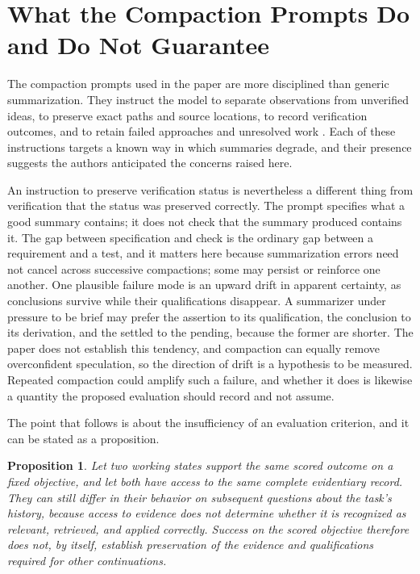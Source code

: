\documentclass[11pt]{article}
\newtheorem{proposition}{Proposition}
\begin{document}
\section{What the Compaction Prompts Do and Do Not Guarantee}

The compaction prompts used in the paper are more disciplined than generic summarization. They instruct the model to separate observations from unverified ideas, to preserve exact paths and source locations, to record verification outcomes, and to retain failed approaches and unresolved work \cite{paper}. Each of these instructions targets a known way in which summaries degrade, and their presence suggests the authors anticipated the concerns raised here.

An instruction to preserve verification status is nevertheless a different thing from verification that the status was preserved correctly. The prompt specifies what a good summary contains; it does not check that the summary produced contains it. The gap between specification and check is the ordinary gap between a requirement and a test, and it matters here because summarization errors need not cancel across successive compactions; some may persist or reinforce one another. One plausible failure mode is an upward drift in apparent certainty, as conclusions survive while their qualifications disappear. A summarizer under pressure to be brief may prefer the assertion to its qualification, the conclusion to its derivation, and the settled to the pending, because the former are shorter. The paper does not establish this tendency, and compaction can equally remove overconfident speculation, so the direction of drift is a hypothesis to be measured. Repeated compaction could amplify such a failure, and whether it does is likewise a quantity the proposed evaluation should record and not assume.

The point that follows is about the insufficiency of an evaluation criterion, and it can be stated as a proposition.

\begin{proposition}
Let two working states support the same scored outcome on a fixed objective, and let both have access to the same complete evidentiary record. They can still differ in their behavior on subsequent questions about the task's history, because access to evidence does not determine whether it is recognized as relevant, retrieved, and applied correctly. Success on the scored objective therefore does not, by itself, establish preservation of the evidence and qualifications required for other continuations.
\end{proposition}
\end{document}
